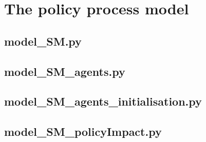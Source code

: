 \section{The policy process model}
\label{sec:}


\subsection{model\_SM.py}



\subsection{model\_SM\_agents.py}



\subsection{model\_SM\_agents\_initialisation.py}



\subsection{model\_SM\_policyImpact.py}


